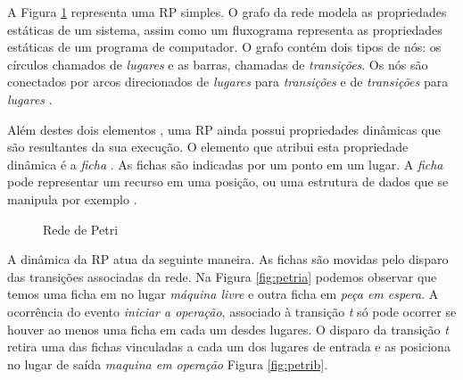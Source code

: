 A Figura \ref{fig:rede_petri} representa uma RP simples. O grafo da rede modela as propriedades estáticas de um sistema, assim como um fluxograma representa as propriedades estáticas de um programa de computador. O grafo contém dois tipos de nós: os círculos chamados de \textit{lugares} e as barras, chamadas de \textit{transições}. Os nós são conectados por arcos direcionados de \textit{lugares} para \textit{transições} e de \textit{transições} para \textit{lugares} \cite{peterson1977petri}. 
% 
% 
% 

Além destes dois elementos , uma RP ainda possui propriedades dinâmicas que são resultantes da sua execução. O elemento que atribui esta propriedade dinâmica é a \textit{ficha} \cite{peterson1977petri}. As fichas são indicadas por um ponto em um lugar. A \textit{ficha} pode representar um recurso em uma posição, ou uma estrutura de dados que se manipula por exemplo \cite{cardoso1997redes}.

\begin{figure}[ht]
  \centering
  \caption{Rede de Petri}
  \label{fig:rede_petri}
\end{figure}

A dinâmica da RP atua da seguinte maneira.  As fichas são movidas pelo disparo das transições associadas da rede. Na Figura \ref{fig:petria} podemos observar que temos uma ficha em no lugar \textit{máquina livre} e outra ficha em \textit{peça em espera}. A ocorrência do evento \textit{iniciar a operação}, associado à transição \textit{t} só pode ocorrer se houver ao menos uma ficha em cada um desdes lugares. O disparo da transição \textit{t} retira uma das fichas vinculadas a cada um dos lugares de entrada e as posiciona no lugar de saída \textit{maquina em operação} Figura \ref{fig:petrib}.

